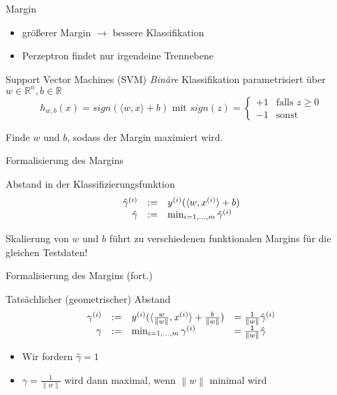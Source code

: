 \documentclass[xcolor={dvipsnames,svgnames},draft]{beamer}
\newcommand{\inner}[2]{\langle{} #1, #2 \rangle{}}
\newcommand{\norm}[1]{\left\lVert#1\right\rVert}
\begin{document}
\begin{frame}{Margin}
\begin{minipage}{0.59\linewidth}
    \begin{itemize}
    \item größerer Margin $\rightarrow$ bessere Klassifikation
    \item Perzeptron findet nur irgendeine Trennebene
    \end{itemize}
  \end{minipage}
\end{frame}

\begin{frame}{Support Vector Machines (SVM)}
  \textit{Binäre} Klassifikation parametrisiert über $w \in \mathbb{R}^n, b \in
  \mathbb{R}$
  \[
    h_{w,b}(x) = sign(\inner{w}{x} + b) 
    \text{ mit } 
    sign(z) = \begin{cases}
      +1 & \text{falls } z \geq 0 \\
      -1 & \text{sonst}
    \end{cases}
  \]

  Finde $w$ und $b$, sodass der Margin maximiert wird.
\end{frame}
\begin{frame}{Formalisierung des Margins}
  \begin{definition}
    Abstand in der Klassifizierungsfunktion
    \[
      \begin{array}{r@{\quad:=\quad}l}
        \hat{\gamma}^{(i)} & y^{(i)}(\inner{w}{x^{(i)}}+b) \\
        \hat{\gamma} & \min_{i=1,\ldots,m}\hat{\gamma}^{(i)}
      \end{array}
    \]
  \end{definition}
  Skalierung von $w$ und $b$ führt zu verschiedenen funktionalen Margins für
  die gleichen Testdaten!
\end{frame}

\begin{frame}{Formalisierung des Margins (fort.)}
  \begin{definition}
    Tatsächlicher (geometrischer) Abstand
    \[
      \begin{array}{r@{\quad:=\quad}ll}
        \gamma^{(i)} & y^{(i)}(\inner{\frac{w}{\norm{w}}}{x^{(i)}}+\frac{b}{\norm{w}}) & = \frac{1}{\norm{w}} \hat{\gamma}^{(i)} \\
        \gamma & \min_{i=1,\ldots,m}\gamma^{(i)} & = \frac{1}{\norm{w}} \hat{\gamma}
      \end{array}
    \]
  \end{definition}

  \begin{itemize}
  \item Wir fordern $\hat{\gamma} = 1$
  \item $\gamma = \frac{1}{\norm{w}}$ wird dann maximal, wenn $\norm{w}$ minimal wird
  \end{itemize}
  
\end{frame}
\end{document}
